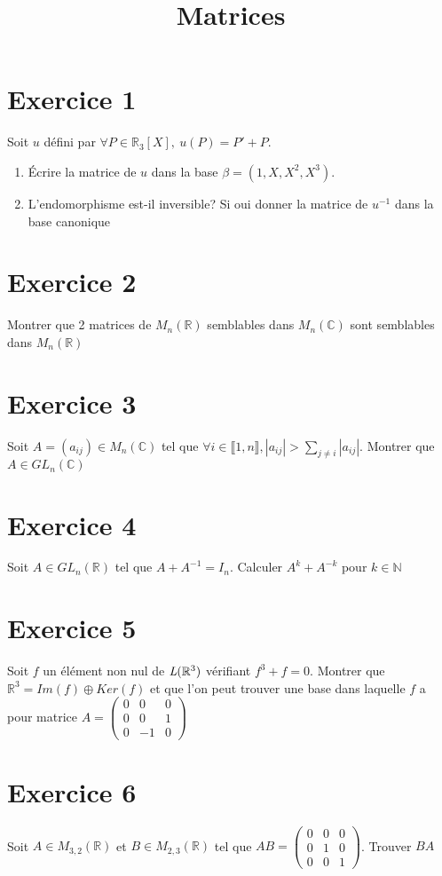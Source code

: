 \documentclass[11pt]{article}
\author{\Name \texttt{\Login}}
\date{}
\title{Matrices}
\begin{document}
\maketitle

\section*{Exercice 1}

Soit $u$ défini par $\forall P\in\mathbb R_3[X],\: u(P) = P' + P$.
\begin{enumerate}
\item Écrire la matrice de $u$ dans la base $\beta=(1,X,X^2,X^3)$.
\item L'endomorphisme est-il inversible? Si oui donner la matrice de $u^{-1}$ dans la base canonique
\end{enumerate} 

\section*{Exercice 2}

Montrer que 2 matrices de $\textit{M}_n(\mathbb{R})$ semblables dans $\textit{M}_n(\mathbb{C})$ sont semblables dans $\textit{M}_n(\mathbb{R})$ 

\section*{Exercice 3}

Soit $A=(a_{ij})\in \textit{M}_n(\mathbb{C})$ tel que $ \forall i\in  \llbracket 1,n \rrbracket, |a_{ij}| > \sum_{j\ne i} |a_{ij}|$. Montrer que $A \in GL_n(\mathbb{C})$

\section*{Exercice 4}

Soit $A \in GL_n(\mathbb{R})$ tel que $A + A^{-1} = I_n.$ Calculer $A^k + A^{-k}$ pour $k\in\mathbb{N}$

\section*{Exercice 5}

Soit $f$ un élément non nul de $\emph{L}(\mathbb{R}^3)$ vérifiant $f^3 + f = 0$. Montrer que $\mathbb{R}^3=Im(f)\oplus Ker(f)$ et que l'on peut trouver une base dans laquelle $f$ a pour matrice $A = \begin{pmatrix} 
0 & 0 & 0 \\
0 & 0 & 1 \\
0 & -1 & 0
\end{pmatrix} $



\section*{Exercice 6}

Soit $A \in M_{3,2}(\mathbb{R})$ et $B \in M_{2,3}(\mathbb{R})$ tel que $AB= \begin{pmatrix}
0 & 0 & 0 \\
0 & 1 & 0 \\
0 & 0 & 1
\end{pmatrix}$. Trouver $BA$
\end{document}
